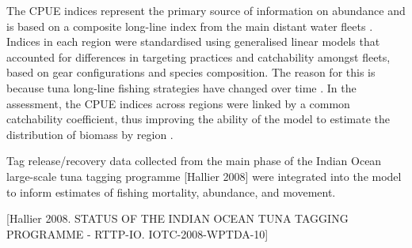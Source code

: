 The CPUE indices represent the primary source of information on abundance and is based on a composite long-line index from the main distant water fleets \parencite{hoyle2018yft}. Indices in each region were standardised using generalised linear models that accounted for differences in targeting practices and catchability amongst fleets, based on gear configurations and species composition. The reason for this is because tuna long-line fishing strategies have changed over time \parencite{hampton2005}. In the assessment, the CPUE indices across regions were linked by a common catchability coefficient, thus improving the ability of the model to estimate the distribution of biomass by region \parencite{langley2015yft, fu2018yft}.

Tag release/recovery data collected from the main phase of the Indian Ocean large-scale tuna tagging programme [Hallier 2008] were integrated into the model to inform estimates of fishing mortality, abundance, and movement. 

[Hallier 2008. STATUS OF THE INDIAN OCEAN TUNA TAGGING PROGRAMME - RTTP-IO. IOTC-2008-WPTDA-10]
